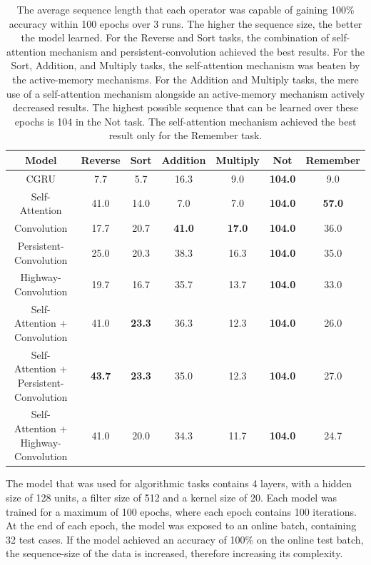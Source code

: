 \documentclass{article}
\begin{document}
\begin{table}
\centering
\begin{tabular}{c|c|c|c|c|c|c}
\toprule
\textbf{Model} & \textbf{Reverse} & \textbf{Sort} & \textbf{Addition} & \textbf{Multiply} & \textbf{Not} & \textbf{Remember} \\
\midrule
CGRU & 7.7 & 5.7 & 16.3 & 9.0 & \textbf{104.0} & 9.0 \\
Self-Attention & 41.0 & 14.0 & 7.0 & 7.0 & \textbf{104.0} & \textbf{57.0} \\
Convolution & 17.7 & 20.7 & \textbf{41.0} & \textbf{17.0} & \textbf{104.0} & 36.0 \\
Persistent-Convolution & 25.0 & 20.3 & 38.3 & 16.3 & \textbf{104.0} & 35.0 \\
Highway-Convolution & 19.7 & 16.7 & 35.7 & 13.7 & \textbf{104.0} & 33.0 \\
Self-Attention + Convolution & 41.0 & \textbf{23.3} & 36.3 & 12.3 & \textbf{104.0} & 26.0 \\
Self-Attention + Persistent-Convolution & \textbf{43.7} & \textbf{23.3} & 35.0 & 12.3 & \textbf{104.0} & 27.0 \\
Self-Attention + Highway-Convolution & 41.0 & 20.0 & 34.3 & 11.7 & \textbf{104.0} & 24.7 \\
\bottomrule
\end{tabular}
\caption{The average sequence length that each operator was capable of gaining 100\% accuracy within 100 epochs over 3 runs. The higher the sequence size, the better the model learned. For the Reverse and Sort tasks, the combination of self-attention mechanism and persistent-convolution achieved the best results. For the Sort, Addition, and Multiply tasks, the self-attention mechanism was beaten by the active-memory mechanisms. For the Addition and Multiply tasks, the mere use of a self-attention mechanism alongside an active-memory mechanism actively decreased results. The highest possible sequence that can be learned over these epochs is 104 in the Not task. The self-attention mechanism achieved the best result only for the Remember task. 
}
\label{tab:booktabs}
\end{table}

The model that was used for algorithmic tasks contains 4 layers, with a hidden size of 128 units, a filter size of 512 and a kernel size of 20. Each model was trained for a maximum of 100 epochs, where each epoch contains 100 iterations. At the end of each epoch, the model was exposed to an online batch, containing 32 test cases. If the model achieved an accuracy of 100\% on the online test batch, the sequence-size of the data is increased, therefore increasing its complexity. 
\end{document}
